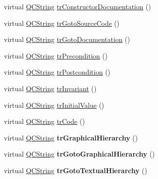\begin{DoxyCompactItemize}
\item 
virtual \mbox{\hyperlink{class_q_c_string}{Q\+C\+String}} \mbox{\hyperlink{class_translator_serbian_a5d850e147da25448c84c5042832a0b85}{tr\+Constructor\+Documentation}} ()
\item 
virtual \mbox{\hyperlink{class_q_c_string}{Q\+C\+String}} \mbox{\hyperlink{class_translator_serbian_afae948febe9f2f505affad92e3b97028}{tr\+Goto\+Source\+Code}} ()
\item 
virtual \mbox{\hyperlink{class_q_c_string}{Q\+C\+String}} \mbox{\hyperlink{class_translator_serbian_a766043268bd3b31ec48add2438e99a8b}{tr\+Goto\+Documentation}} ()
\item 
virtual \mbox{\hyperlink{class_q_c_string}{Q\+C\+String}} \mbox{\hyperlink{class_translator_serbian_a891e6e79429d1a09adcaad0a25774a34}{tr\+Precondition}} ()
\item 
virtual \mbox{\hyperlink{class_q_c_string}{Q\+C\+String}} \mbox{\hyperlink{class_translator_serbian_a4bf8f7ff9f2980ffb7fb13ebddf06c40}{tr\+Postcondition}} ()
\item 
virtual \mbox{\hyperlink{class_q_c_string}{Q\+C\+String}} \mbox{\hyperlink{class_translator_serbian_ac9100d9227ed8ecd0262a0dc415bcd8a}{tr\+Invariant}} ()
\item 
virtual \mbox{\hyperlink{class_q_c_string}{Q\+C\+String}} \mbox{\hyperlink{class_translator_serbian_a65bb2a1ebec186e011d69de752e30f15}{tr\+Initial\+Value}} ()
\item 
virtual \mbox{\hyperlink{class_q_c_string}{Q\+C\+String}} \mbox{\hyperlink{class_translator_serbian_ac4b5a25d39be07d2821ba45c01878ece}{tr\+Code}} ()
\item 
\mbox{\label{class_translator_serbian_a7a1ed244361a20795362b7acdfd3f7c4}} 
virtual \mbox{\hyperlink{class_q_c_string}{Q\+C\+String}} {\bfseries tr\+Graphical\+Hierarchy} ()
\item 
\mbox{\label{class_translator_serbian_a5defcb16ae826b92842e9a88301536b1}} 
virtual \mbox{\hyperlink{class_q_c_string}{Q\+C\+String}} {\bfseries tr\+Goto\+Graphical\+Hierarchy} ()
\item 
\mbox{\label{class_translator_serbian_a948a1f8f8ae42c07fe5abc040fbccc4e}} 
virtual \mbox{\hyperlink{class_q_c_string}{Q\+C\+String}} {\bfseries tr\+Goto\+Textual\+Hierarchy} ()
\item 
\mbox{\label{class_translator_serbian_a4fb3e15b4d2cd340d92fe12c89bf7b02}} 

\end{DoxyCompactItemize}
